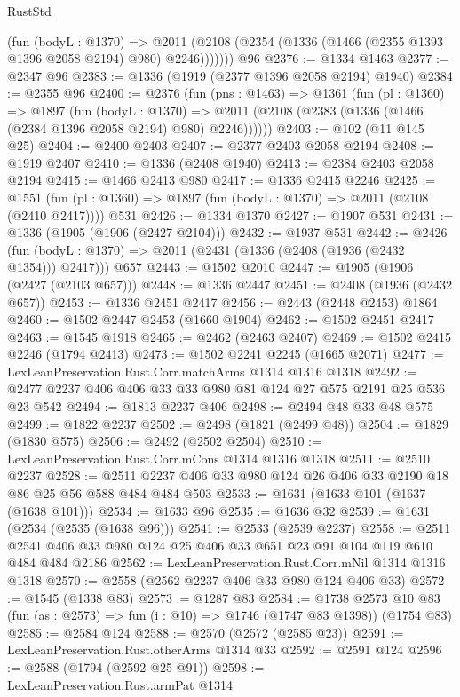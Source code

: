 \begin{lexlean}{RustStd}
\begin{coremodule}
          (fun (bodyL : @1370) =>
          @2011 (@2108 (@2354 (@1336 (@1466 (@2355 @1393 @1396 @2058 @2194) @980) @2246)))))))
    @96
@2376 := @1334 @1463
@2377 := @2347 @96
@2383 := @1336 (@1919 (@2377 @1396 @2058 @2194) @1940)
@2384 := @2355 @96
@2400 := @2376
    (fun (pns : @1463) =>
    @1361
      (fun (pl : @1360) =>
      @1897
        (fun (bodyL : @1370) =>
        @2011 (@2108 (@2383 (@1336 (@1466 (@2384 @1396 @2058 @2194) @980) @2246))))))
@2403 := @102 (@11 @145 @25)
@2404 := @2400 @2403
@2407 := @2377 @2403 @2058 @2194
@2408 := @1919 @2407
@2410 := @1336 (@2408 @1940)
@2413 := @2384 @2403 @2058 @2194
@2415 := @1466 @2413 @980
@2417 := @1336 @2415 @2246
@2425 := @1551 (fun (pl : @1360) => @1897 (fun (bodyL : @1370) => @2011 (@2108 (@2410 @2417)))) @531
@2426 := @1334 @1370
@2427 := @1907 @531
@2431 := @1336 (@1905 (@1906 (@2427 @2104)))
@2432 := @1937 @531
@2442 := @2426
    (fun (bodyL : @1370) => @2011 (@2431 (@1336 (@2408 (@1936 (@2432 @1354))) @2417)))
    @657
@2443 := @1502 @2010
@2447 := @1905 (@1906 (@2427 (@2103 @657)))
@2448 := @1336 @2447
@2451 := @2408 (@1936 (@2432 @657))
@2453 := @1336 @2451 @2417
@2456 := @2443 (@2448 @2453) @1864
@2460 := @1502 @2447 @2453 (@1660 @1904)
@2462 := @1502 @2451 @2417
@2463 := @1545 @1918
@2465 := @2462 (@2463 @2407)
@2469 := @1502 @2415 @2246 (@1794 @2413)
@2473 := @1502 @2241 @2245 (@1665 @2071)
@2477 := LexLeanPreservation.Rust.Corr.matchArms @1314 @1316 @1318
@2492 := @2477 @2237 @406 @406 @33 @33 @980 @81 @124 @27 @575 @2191 @25 @536 @23 @542
@2494 := @1813 @2237 @406
@2498 := @2494 @48 @33 @48 @575
@2499 := @1822 @2237
@2502 := @2498 (@1821 (@2499 @48))
@2504 := @1829 (@1830 @575)
@2506 := @2492 (@2502 @2504)
@2510 := LexLeanPreservation.Rust.Corr.mCons @1314 @1316 @1318
@2511 := @2510 @2237
@2528 := @2511 @2237 @406 @33 @980 @124 @26 @406 @33 @2190 @18 @86 @25 @56 @588 @484 @484 @503
@2533 := @1631 (@1633 @101 (@1637 (@1638 @101)))
@2534 := @1633 @96
@2535 := @1636 @32
@2539 := @1631 (@2534 (@2535 (@1638 @96)))
@2541 := @2533 (@2539 @2237)
@2558 := @2511 @2541 @406 @33 @980 @124 @25 @406 @33 @651 @23 @91 @104 @119 @610 @484 @484 @2186
@2562 := LexLeanPreservation.Rust.Corr.mNil @1314 @1316 @1318
@2570 := @2558 (@2562 @2237 @406 @33 @980 @124 @406 @33)
@2572 := @1545 (@1338 @83)
@2573 := @1287 @83
@2584 := @1738
    @2573
    @10
    @83
    (fun (as : @2573) => fun (i : @10) => @1746 (@1747 @83 @1398))
    (@1754 @83)
@2585 := @2584 @124
@2588 := @2570 (@2572 (@2585 @23))
@2591 := LexLeanPreservation.Rust.otherArms @1314 @33
@2592 := @2591 @124
@2596 := @2588 (@1794 (@2592 @25 @91))
@2598 := LexLeanPreservation.Rust.armPat @1314

\end{coremodule}
\end{lexlean}
